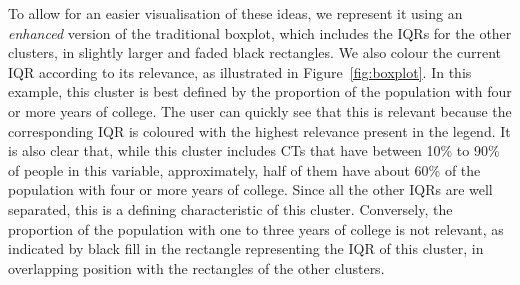 To allow for an easier visualisation of these ideas, we represent it using an
\emph{enhanced} version of the traditional boxplot, which includes the IQRs for
the other clusters, in slightly larger and faded black rectangles. We also
colour the current IQR according to its relevance, as illustrated in
Figure~\ref{fig:boxplot}. In this example, this cluster is best defined by the
proportion of the population with four or more years of college. The user can
quickly see that this is relevant because the corresponding IQR is coloured with
the highest relevance present in the legend. It is also clear that, while this
cluster includes CTs that have between 10\% to 90\% of people in this variable,
approximately, half of them have about 60\% of the population with four or more
years of college. Since all the other IQRs are well separated, this is a
defining characteristic of this cluster. Conversely, the proportion of the
population with one to three years of college is not relevant, as indicated by
black fill in the rectangle representing the IQR of this cluster, in overlapping
position with the rectangles of the other clusters.

